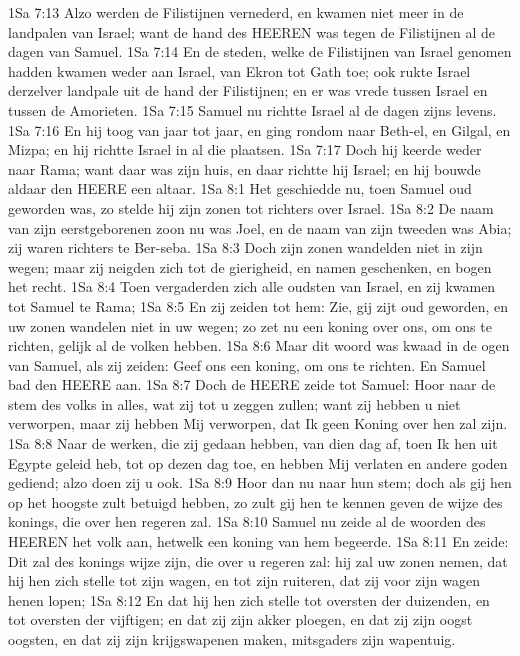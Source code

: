 1Sa 7:13  Alzo werden de Filistijnen vernederd, en kwamen niet meer in de landpalen van Israel; want de hand des HEEREN was tegen de Filistijnen al de dagen van Samuel.
1Sa 7:14  En de steden, welke de Filistijnen van Israel genomen hadden kwamen weder aan Israel, van Ekron tot Gath toe; ook rukte Israel derzelver landpale uit de hand der Filistijnen; en er was vrede tussen Israel en tussen de Amorieten.
1Sa 7:15  Samuel nu richtte Israel al de dagen zijns levens.
1Sa 7:16  En hij toog van jaar tot jaar, en ging rondom naar Beth-el, en Gilgal, en Mizpa; en hij richtte Israel in al die plaatsen.
1Sa 7:17  Doch hij keerde weder naar Rama; want daar was zijn huis, en daar richtte hij Israel; en hij bouwde aldaar den HEERE een altaar.
1Sa 8:1  Het geschiedde nu, toen Samuel oud geworden was, zo stelde hij zijn zonen tot richters over Israel.
1Sa 8:2  De naam van zijn eerstgeborenen zoon nu was Joel, en de naam van zijn tweeden was Abia; zij waren richters te Ber-seba.
1Sa 8:3  Doch zijn zonen wandelden niet in zijn wegen; maar zij neigden zich tot de gierigheid, en namen geschenken, en bogen het recht.
1Sa 8:4  Toen vergaderden zich alle oudsten van Israel, en zij kwamen tot Samuel te Rama;
1Sa 8:5  En zij zeiden tot hem: Zie, gij zijt oud geworden, en uw zonen wandelen niet in uw wegen; zo zet nu een koning over ons, om ons te richten, gelijk al de volken hebben.
1Sa 8:6  Maar dit woord was kwaad in de ogen van Samuel, als zij zeiden: Geef ons een koning, om ons te richten. En Samuel bad den HEERE aan.
1Sa 8:7  Doch de HEERE zeide tot Samuel: Hoor naar de stem des volks in alles, wat zij tot u zeggen zullen; want zij hebben u niet verworpen, maar zij hebben Mij verworpen, dat Ik geen Koning over hen zal zijn.
1Sa 8:8  Naar de werken, die zij gedaan hebben, van dien dag af, toen Ik hen uit Egypte geleid heb, tot op dezen dag toe, en hebben Mij verlaten en andere goden gediend; alzo doen zij u ook.
1Sa 8:9  Hoor dan nu naar hun stem; doch als gij hen op het hoogste zult betuigd hebben, zo zult gij hen te kennen geven de wijze des konings, die over hen regeren zal.
1Sa 8:10  Samuel nu zeide al de woorden des HEEREN het volk aan, hetwelk een koning van hem begeerde.
1Sa 8:11  En zeide: Dit zal des konings wijze zijn, die over u regeren zal: hij zal uw zonen nemen, dat hij hen zich stelle tot zijn wagen, en tot zijn ruiteren, dat zij voor zijn wagen henen lopen;
1Sa 8:12  En dat hij hen zich stelle tot oversten der duizenden, en tot oversten der vijftigen; en dat zij zijn akker ploegen, en dat zij zijn oogst oogsten, en dat zij zijn krijgswapenen maken, mitsgaders zijn wapentuig.
